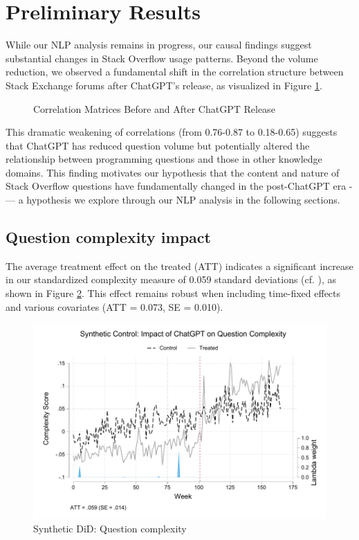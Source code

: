 \section{Preliminary Results}
While our NLP analysis remains in progress, our causal findings suggest substantial changes in Stack Overflow usage patterns. Beyond the volume reduction, we observed a fundamental shift in the correlation structure between Stack Exchange forums after ChatGPT's release, as visualized in Figure \ref{fig:correlation_matrix}.

\begin{figure}[htpb!]
    \centering
    
    \caption{Correlation Matrices Before and After ChatGPT Release}
    \label{fig:correlation_matrix}
\end{figure}

This dramatic weakening of correlations (from 0.76-0.87 to 0.18-0.65) suggests that ChatGPT has reduced question volume but potentially altered the relationship between programming questions and those in other knowledge domains. This finding motivates our hypothesis that the content and nature of Stack Overflow questions have fundamentally changed in the post-ChatGPT era -— a hypothesis we explore through our NLP analysis in the following sections.


\subsection{Question complexity impact}

The average treatment effect on the treated (ATT) indicates a significant increase in our standardized complexity measure of 0.059 standard deviations (cf. ), as shown in Figure \ref{fig:cscore_synthetic_control}. This effect remains robust when including time-fixed effects and various covariates (ATT = 0.073, SE = 0.010).  

\begin{figure}[H]
    \centering
    \includegraphics[width=1\linewidth]{imgs/stata/sdid_nlp_trends101.pdf}
    \caption{Synthetic DiD: Question complexity}
    \label{fig:cscore_synthetic_control}
\end{figure}

